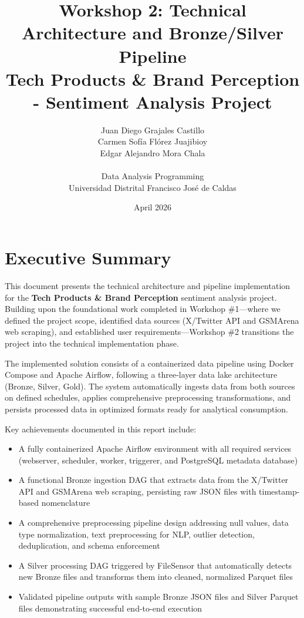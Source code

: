 \documentclass[11pt,a4paper]{article}
\title{Workshop 2: Technical Architecture and Bronze/Silver Pipeline\\
\large Tech Products \& Brand Perception - Sentiment Analysis Project}
\author{
    Juan Diego Grajales Castillo\\
    Carmen Sofía Flórez Juajibioy\\
    Edgar Alejandro Mora Chala\\
    \vspace{0.5cm}\\
    Data Analysis Programming\\
    Universidad Distrital Francisco José de Caldas
}
\date{April 2026}
\begin{document}
\maketitle
\thispagestyle{empty}
\newpage

\tableofcontents
\newpage

\section{Executive Summary}

This document presents the technical architecture and pipeline implementation for the \textbf{Tech Products \& Brand Perception} sentiment analysis project. Building upon the foundational work completed in Workshop \#1—where we defined the project scope, identified data sources (X/Twitter API and GSMArena web scraping), and established user requirements—Workshop \#2 transitions the project into the technical implementation phase.

The implemented solution consists of a containerized data pipeline using Docker Compose and Apache Airflow, following a three-layer data lake architecture (Bronze, Silver, Gold). The system automatically ingests data from both sources on defined schedules, applies comprehensive preprocessing transformations, and persists processed data in optimized formats ready for analytical consumption.

Key achievements documented in this report include:
\begin{itemize}
    \item A fully containerized Apache Airflow environment with all required services (webserver, scheduler, worker, triggerer, and PostgreSQL metadata database)
    \item A functional Bronze ingestion DAG that extracts data from the X/Twitter API and GSMArena web scraping, persisting raw JSON files with timestamp-based nomenclature
    \item A comprehensive preprocessing pipeline design addressing null values, data type normalization, text preprocessing for NLP, outlier detection, deduplication, and schema enforcement
    \item A Silver processing DAG triggered by FileSensor that automatically detects new Bronze files and transforms them into cleaned, normalized Parquet files
    \item Validated pipeline outputs with sample Bronze JSON files and Silver Parquet files demonstrating successful end-to-end execution
\end{itemize}
\end{document}
